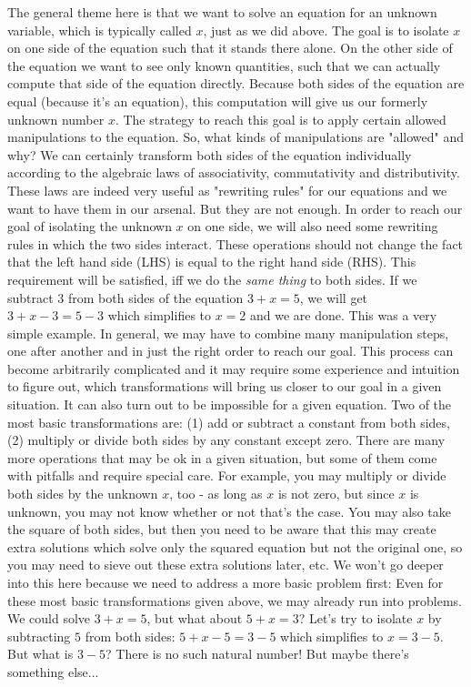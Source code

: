 \medskip
The general theme here is that we want to solve an equation for an unknown variable, which is typically called $x$, just as we did above. The goal is to isolate $x$ on one side of the equation such that it stands there alone. On the other side of the equation we want to see only known quantities, such that we can actually compute that side of the equation directly. Because both sides of the equation are equal (because it's an equation), this computation will give us our formerly unknown number $x$. The strategy to reach this goal is to apply certain allowed manipulations to the equation. So, what kinds of manipulations are "allowed" and why?  We can certainly transform both sides of the equation individually according to the algebraic laws of associativity, commutativity and distributivity. These laws are indeed very useful as "rewriting rules" for our equations and we want to have them in our arsenal. But they are not enough. In order to reach our goal of isolating the unknown $x$ on one side, we will also need some rewriting rules in which the two sides interact. These operations should not change the fact that the left hand side (LHS) is equal to the right hand side (RHS). This requirement will be satisfied, iff we do the \emph{same thing} to both sides. If we subtract $3$ from both sides of the equation $3 + x = 5$, we will get $3 + x - 3 = 5 - 3$ which simplifies to $x = 2$ and we are done. This was a very simple example. In general, we may have to combine many manipulation steps, one after another and in just the right order to reach our goal. This process can become arbitrarily complicated  and it may require some experience and intuition to figure out, which transformations will bring us closer to our goal in a given situation. It can also turn out to be impossible for a given equation. Two of the most basic transformations are: (1) add or subtract a constant from both sides, (2) multiply or divide both sides by any constant except zero. There are many more operations that may be ok in a given situation, but some of them come with pitfalls and require special care. For example, you may multiply or divide both sides by the unknown $x$, too - as long as $x$ is not zero, but since $x$ is unknown, you may not know whether or not that's the case. You may also take the square of both sides, but then you need to be aware that this may create extra solutions which solve only the squared equation but not the original one, so you may need to sieve out these extra solutions later, etc. We won't go deeper into this here because we need to address a more basic problem first: Even for these most basic transformations given above, we may already run into problems. We could solve $3 + x = 5$, but what about $5 + x = 3$? Let's try to isolate $x$ by subtracting $5$ from both sides: $5 + x - 5 = 3 - 5$ which simplifies to $x = 3 - 5$. But what is $3-5$? There is no such natural number! But maybe there's something else...

